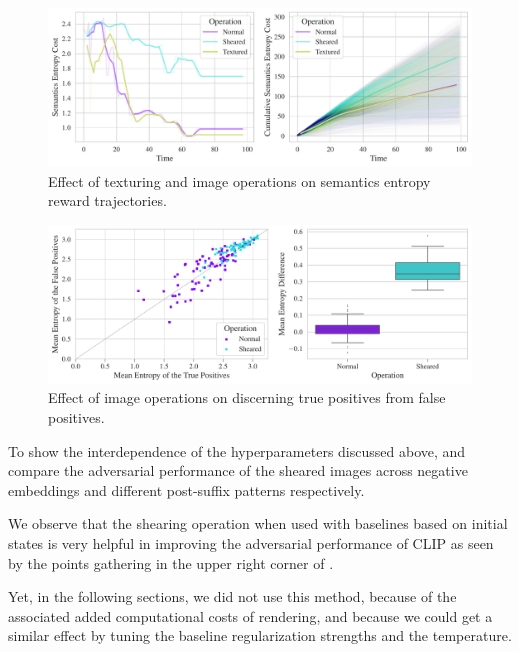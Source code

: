 \begin{figure}[H]
    \centering
    \includegraphics[width=\textwidth]{images/texturing_operations_comparison.pdf}
    \caption{Effect of texturing and image operations on semantics entropy reward trajectories.}
    \label{fig:texturing-operations}
\end{figure}

\begin{figure}[H]
    \centering
    \includegraphics[width=\textwidth]{images/texturing-operations_adversarial_2.pdf}
    \caption{Effect of image operations on discerning true positives from false positives.}
    \label{fig:texturing-operations-adversarial}
\end{figure}

To show the interdependence of the hyperparameters discussed above,  and   compare the adversarial performance of the sheared images across negative embeddings and different post-suffix patterns respectively.

We observe that the shearing operation when used with baselines based on initial states is very helpful in improving the adversarial performance of CLIP as seen by the points gathering in the upper right corner of .

Yet, in the following sections, we did not use this method, because of the associated added computational costs of rendering, and because we could get a similar effect by tuning the baseline regularization strengths and the temperature.

